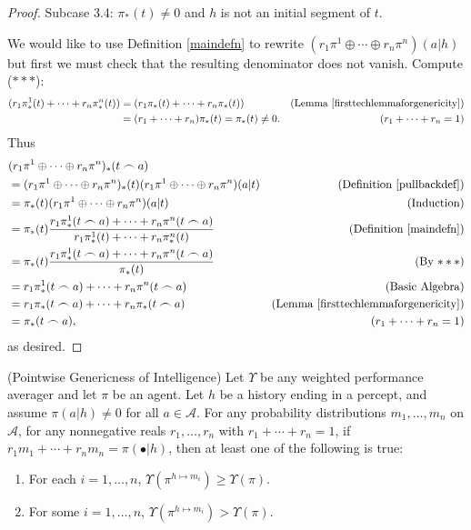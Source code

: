 \documentclass[runningheads]{llncs}
\begin{document}
\begin{proof}
    Subcase 3.4: $\pi_*(t)\not=0$ and $h$ is not an initial segment of $t$.

    We would like to use Definition \ref{maindefn} to rewrite
    $(r_1\pi^1\oplus\cdots\oplus r_n\pi^n)(a|h)$ but first we must
    check that the resulting denominator does not vanish.
    Compute ($***$):
    \begin{align*}
        (r_1\pi^1_*(t)+\cdots+r_n\pi^n_*(t))
            &= (r_1\pi_*(t)+\cdots+r_n\pi_*(t))
                &\mbox{(Lemma \ref{firsttechlemmaforgenericity})}\\
            &= (r_1+\cdots+r_n)\pi_*(t)=\pi_*(t)\not=0.
                &\mbox{($r_1+\cdots+r_n=1$)}
    \end{align*}
    Thus
    \begin{align*}
        &{} (r_1\pi^1\oplus\cdots\oplus r_n\pi^n)_*(t\frown a)\\
            &= (r_1\pi^1\oplus\cdots\oplus r_n\pi^n)_*(t)
                (r_1\pi^1\oplus\cdots\oplus r_n\pi^n)(a|t)
                    &\mbox{(Definition \ref{pullbackdef})}\\
            &= \pi_*(t)(r_1\pi^1\oplus\cdots\oplus r_n\pi^n)(a|t)
                    &\mbox{(Induction)}\\
            &= \pi_*(t)\frac{r_1\pi^1_*(t\frown a)+\cdots+r_n\pi^n(t\frown a)}
                {r_1\pi^1_*(t)+\cdots+r_n\pi^n_*(t)}
                    &\mbox{(Definition \ref{maindefn})}\\
            &= \pi_*(t)\frac{r_1\pi^1_*(t\frown a)+\cdots+r_n\pi^n(t\frown a)}{\pi_*(t)}
                    &\mbox{(By $***$)}\\
            &= r_1\pi^1_*(t\frown a)+\cdots+r_n\pi^n(t\frown a)
                    &\mbox{(Basic Algebra)}\\
            &= r_1\pi_*(t\frown a)+\cdots+r_n\pi_*(t\frown a)
                    &\mbox{(Lemma \ref{firsttechlemmaforgenericity})}\\
            &= \pi_*(t\frown a),
                    &\mbox{($r_1+\cdots+r_n=1$)}
    \end{align*}
    as desired.
\end{proof}

\begin{theorem}
    (Pointwise Genericness of Intelligence)
    Let $\Upsilon$ be any weighted performance averager and let
    $\pi$ be an agent.
    Let $h$ be a history ending in a percept, and assume
    $\pi(a|h)\not=0$ for all $a\in\mathcal A$.
    For any probability distributions $m_1,\ldots,m_n$ on $\mathcal A$,
    for any nonnegative reals $r_1,\ldots,r_n$ with $r_1+\cdots+r_n=1$,
    if $r_1m_1+\cdots+r_nm_n=\pi(\bullet|h)$,
    then at least one of the following is true:
    \begin{enumerate}
        \item For each $i=1,\ldots,n$, $\Upsilon(\pi^{h\mapsto m_i})\geq \Upsilon(\pi)$.
        \item For some $i=1,\ldots,n$, $\Upsilon(\pi^{h\mapsto m_i})>\Upsilon(\pi)$.
    \end{enumerate}
\end{theorem}
\end{document}
